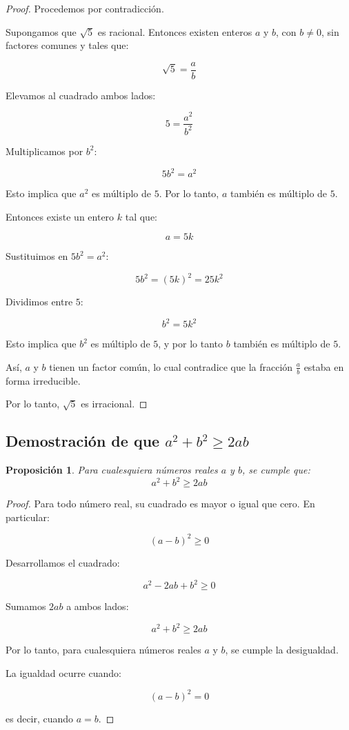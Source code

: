 \documentclass[12pt,final]{report}
\theoremstyle{plain}
\newtheorem{proposition}[theorem]{Proposición}
\theoremstyle{definition}
\begin{document}
\begin{proof}

Procedemos por contradicción.

Supongamos que $\sqrt{5}$ es racional. Entonces existen enteros $a$ y $b$, con $b\neq 0$, sin factores comunes y tales que:

\[
\sqrt{5}=\frac{a}{b}
\]

Elevamos al cuadrado ambos lados:

\[
5=\frac{a^2}{b^2}
\]

Multiplicamos por $b^2$:

\[
5b^2=a^2
\]

Esto implica que $a^2$ es múltiplo de $5$. Por lo tanto, $a$ también es múltiplo de $5$.

Entonces existe un entero $k$ tal que:

\[
a=5k
\]

Sustituimos en $5b^2=a^2$:

\[
5b^2=(5k)^2=25k^2
\]

Dividimos entre $5$:

\[
b^2=5k^2
\]

Esto implica que $b^2$ es múltiplo de $5$, y por lo tanto $b$ también es múltiplo de $5$.

Así, $a$ y $b$ tienen un factor común, lo cual contradice que la fracción $\frac{a}{b}$ estaba en forma irreducible.

Por lo tanto, $\sqrt{5}$ es irracional.

\end{proof}

\newpage

\subsection{Demostración de que $a^2+b^2\geq 2ab$}

\begin{proposition}
Para cualesquiera números reales $a$ y $b$, se cumple que:
\[
a^2+b^2\geq 2ab
\]
\end{proposition}

\begin{proof}

Para todo número real, su cuadrado es mayor o igual que cero. En particular:

\[
(a-b)^2\geq 0
\]

Desarrollamos el cuadrado:

\[
a^2-2ab+b^2\geq 0
\]

Sumamos $2ab$ a ambos lados:

\[
a^2+b^2\geq 2ab
\]

Por lo tanto, para cualesquiera números reales $a$ y $b$, se cumple la desigualdad.

La igualdad ocurre cuando:

\[
(a-b)^2=0
\]

es decir, cuando $a=b$.

\end{proof}
\end{document}
